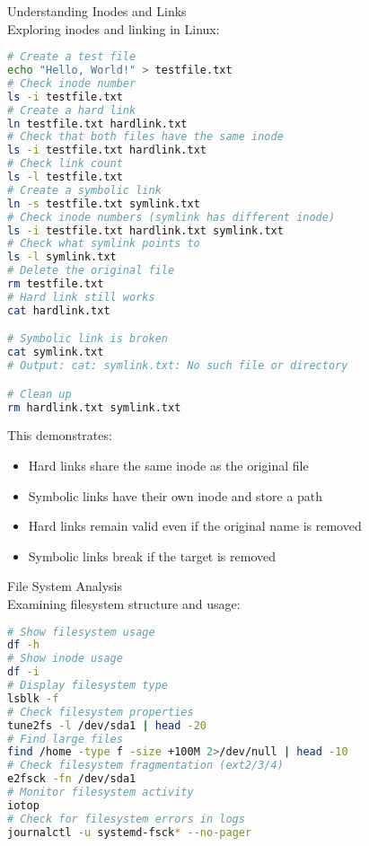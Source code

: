 \begin{example2}{Understanding Inodes and Links}\\
    Exploring inodes and linking in Linux:
    
\begin{lstlisting}[language=bash, style=basesmol]
# Create a test file
echo "Hello, World!" > testfile.txt
# Check inode number
ls -i testfile.txt
# Create a hard link
ln testfile.txt hardlink.txt
# Check that both files have the same inode
ls -i testfile.txt hardlink.txt
# Check link count
ls -l testfile.txt
# Create a symbolic link
ln -s testfile.txt symlink.txt
# Check inode numbers (symlink has different inode)
ls -i testfile.txt hardlink.txt symlink.txt
# Check what symlink points to
ls -l symlink.txt
# Delete the original file
rm testfile.txt
# Hard link still works
cat hardlink.txt

# Symbolic link is broken
cat symlink.txt
# Output: cat: symlink.txt: No such file or directory

# Clean up
rm hardlink.txt symlink.txt
\end{lstlisting}

    This demonstrates:
    \begin{itemize}
        \item Hard links share the same inode as the original file
        \item Symbolic links have their own inode and store a path
        \item Hard links remain valid even if the original name is removed
        \item Symbolic links break if the target is removed
    \end{itemize}
\end{example2}

\begin{example2}{File System Analysis}\\
    Examining filesystem structure and usage:
    
\begin{lstlisting}[language=bash, style=basesmol]
# Show filesystem usage
df -h
# Show inode usage
df -i
# Display filesystem type
lsblk -f
# Check filesystem properties
tune2fs -l /dev/sda1 | head -20
# Find large files
find /home -type f -size +100M 2>/dev/null | head -10
# Check filesystem fragmentation (ext2/3/4)
e2fsck -fn /dev/sda1
# Monitor filesystem activity
iotop
# Check for filesystem errors in logs
journalctl -u systemd-fsck* --no-pager
\end{lstlisting}
\end{example2}